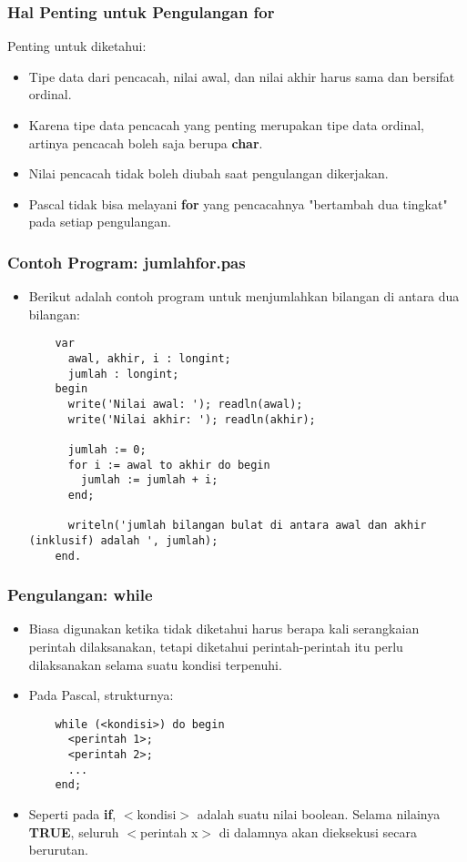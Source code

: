 \documentclass{beamer}
\begin{document}
\begin{frame}
\frametitle{Hal Penting untuk Pengulangan for}
Penting untuk diketahui:
\begin{itemize}
  \item Tipe data dari pencacah, nilai awal, dan nilai akhir harus sama dan bersifat \alert{ordinal}.
  \item Karena tipe data pencacah yang penting merupakan tipe data ordinal, artinya pencacah boleh saja berupa \textbf{char}.
  \item Nilai pencacah tidak boleh diubah saat pengulangan dikerjakan.
  \item Pascal tidak bisa melayani \textbf{for} yang pencacahnya "bertambah dua tingkat" pada setiap pengulangan.
\end{itemize}
\end{frame}

\begin{frame}[fragile]
\frametitle{Contoh Program: jumlahfor.pas}
\begin{itemize}
  \item Berikut adalah contoh program untuk menjumlahkan bilangan di antara dua bilangan:
  \begin{lstlisting}
    var
      awal, akhir, i : longint;
      jumlah : longint;
    begin
      write('Nilai awal: '); readln(awal);
      write('Nilai akhir: '); readln(akhir);

      jumlah := 0;
      for i := awal to akhir do begin
        jumlah := jumlah + i;
      end;

      writeln('jumlah bilangan bulat di antara awal dan akhir (inklusif) adalah ', jumlah);
    end.
  \end{lstlisting}
\end{itemize}
\end{frame}

\begin{frame}[fragile]
\frametitle{Pengulangan: while}
\begin{itemize}
  \item Biasa digunakan ketika tidak diketahui harus berapa kali serangkaian perintah dilaksanakan, tetapi diketahui perintah-perintah itu perlu dilaksanakan selama suatu kondisi terpenuhi.
  \item Pada Pascal, strukturnya:
  \begin{lstlisting}
    while (<kondisi>) do begin
      <perintah 1>;
      <perintah 2>;
      ...
    end;
  \end{lstlisting}
  \item Seperti pada \textbf{if}, $<$kondisi$>$ adalah suatu nilai boolean. Selama nilainya \textbf{TRUE}, seluruh $<$perintah x$>$ di dalamnya akan dieksekusi secara berurutan.
\end{itemize}
\end{frame}
\end{document}
